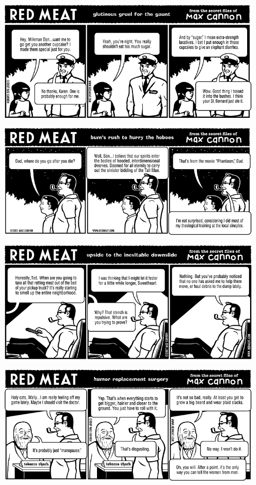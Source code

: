 \documentclass[a4paper,twoside,11pt]{article}
\begin{document}
\includegraphics[width=\textwidth]{redmeat_2007-07-31.png}



\includegraphics[width=\textwidth]{redmeat_2007-08-07.png}



\includegraphics[width=\textwidth]{redmeat_2007-08-14.png}



\includegraphics[width=\textwidth]{redmeat_2007-08-21.png}
\end{document}
